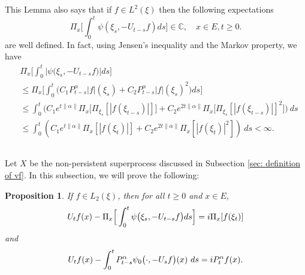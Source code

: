 \documentclass[12pt,a4paper]{amsart}
\theoremstyle{plain}
\newtheorem{prop}[thm]{Proposition}
\theoremstyle{definition}
\numberwithin{equation}{section}
\begin{document}
    This Lemma also says that if $f\in L^2(\xi)$ then the following expectations
\[
    \Pi_x\Big[\int_0^t \psi(\xi_s,- U_{t-s}f)ds\Big]
    \in \mathbb C,
    \quad x\in E, t\geq 0.
\]
    are well defined.
    In fact, using Jensen's inequality and the Markov property, we have
\begin{equation}\begin{split}
\label{eq: domination of psi(v)}
    &\Pi_x\Big[\int_0^t \big|\psi \big(\xi_s,-U_{t-s}f\big)\big|ds\Big]
    \\&\leq \Pi_x\Big[\int_0^t \big(C_1 P_{t-s}^\alpha|f|(\xi_s)+C_2 P_{t-s}^\alpha|f|(\xi_s)^2\big)ds\Big]
    \\ &\leq \int_0^t \big(C_1 e^{t\|\alpha\|}\Pi_x \big[ \Pi_{\xi_s}[|f(\xi_{t-s})|] \big]+C_2 e^{2t\|\alpha\|}\Pi_x \big[ \Pi_{\xi_s}[|f (\xi_{t-s})|]^2 \big]\big)~ds
    \\ &\leq \int_0^t (C_1 e^{t\|\alpha\|}\Pi_x [ |f(\xi_{t})|]+C_2e^{2t\|\alpha\|}\Pi_x [ |f (\xi_{t})|^2 ])~ds < \infty.
\end{split}\end{equation}

\subsection{}
    Let $X$ be the non-persistent superprocess discussed in Subsection \ref{sec: definition of vf}.
    In this subsection, we will prove the following:
    \begin{prop}
\label{prop: complex FKPP-equation}
    If $f\in L_2(\xi)$,  then for all $t\geq 0$ and $x\in E$,
\begin{equation}
\label{eq: complex FKPP-equation}
    U_tf(x) - \Pi_x \Big[\int_0^t \psi\big(\xi_s, - U_{t-s}f\big) ds \Big]
    \\= i \Pi_x [f(\xi_t)]
\end{equation}
and
\begin{equation}
\label{eq: complex FKPP-equation with FK-transform}
    U_tf(x) -  \int_0^t P_{t-s}^{\alpha} \psi_0\big(\cdot,-U_sf\big) (x)~ds
   \\= iP_t^\alpha f(x).
\end{equation}
\end{prop}
\end{document}
